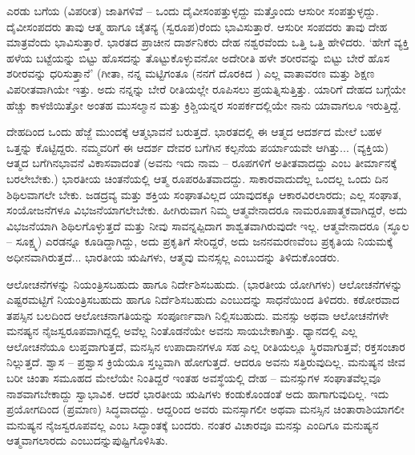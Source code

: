 \vskip 4pt

ಎರಡು ಬಗೆಯ (ವಿಪರೀತ) ಜಾತಿಗಳಿವೆ – ಒಂದು ದೈವೀಸಂಪತ್ತುಳ್ಳದ್ದು ಮತ್ತೊಂದು ಆಸುರೀ ಸಂಪತ್ತುಳ್ಳದ್ದು. ದೈವೀಸಂಪದರು ತಾವು ಆತ್ಮ ಹಾಗೂ ಚೈತನ್ಯ (ಸ್ವರೂಪ)ರೆಂದು ಭಾವಿಸುತ್ತಾರೆ. ಆಸುರೀ ಸಂಪದರು ತಾವು ದೇಹ ಮಾತ್ರವೆಂದು ಭಾವಿಸುತ್ತಾರೆ. ಭಾರತದ ಪ್ರಾಚೀನ ದಾರ್ಶನಿಕರು ದೇಹ ನಶ್ವರವೆಂದು ಒತ್ತಿ ಒತ್ತಿ ಹೇಳಿದರು. `ಹೇಗೆ ವ್ಯಕ್ತಿ ಹಳೆಯ ಬಟ್ಟೆಯನ್ನು ಬಿಟ್ಟು ಹೊಸದನ್ನು ತೊಟ್ಟುಕೊಳ್ಳುವನೋ ಅದೇರೀತಿ ಹಳೇ ಶರೀರವನ್ನು ಬಿಟ್ಟು ಬೇರೆ ಹೊಸ ಶರೀರವನ್ನು ಧರಿಸುತ್ತಾನೆ' (ಗೀತಾ,  ನನ್ನ ಮಟ್ಟಿಗಂತೂ (ನನಗೆ ದೊರಕಿದ ) ಎಲ್ಲ ವಾತಾವರಣ ಮತ್ತು ಶಿಕ್ಷಣ ವಿಪರೀತವಾಗಿಯೇ ಇತ್ತು. ಅದು ನನ್ನನ್ನು ಬೇರೆ ರೀತಿಯಲ್ಲೇ ರೂಪಿಸಲು ಪ್ರಯತ್ನಿಸುತ್ತಿತ್ತು. ಯಾರಿಗೆ ದೇಹದ ಬಗ್ಗೆಯೇ ಹೆಚ್ಚು ಕಾಳಜಿಯಿತ್ತೋ ಅಂತಹ ಮುಸಲ್ಮಾನ ಮತ್ತು ಕ್ರಿಶ್ಚಿಯನ್ನರ ಸಂಪರ್ಕದಲ್ಲಿಯೇ ನಾನು ಯಾವಾಗಲೂ ಇರುತ್ತಿದ್ದೆ.

\vskip 4pt

ದೇಹದಿಂದ ಒಂದು ಹೆಜ್ಜೆ ಮುಂದಕ್ಕೆ ಆತ್ಮಭಾವನೆ ಬರುತ್ತದೆ. ಭಾರತದಲ್ಲಿ ಈ ಆತ್ಮದ ಆದರ್ಶದ ಮೇಲೆ ಬಹಳ ಒತ್ತನ್ನು ಕೊಟ್ಟಿದ್ದರು. ನಮ್ಮವರಿಗೆ ಈ ಆದರ್ಶ ದೇವರ ಬಗೆಗಿನ ಕಲ್ಪನೆಯ ಪರ್ಯಾಯವೇ ಆಗಿತ್ತು... (ವ್ಯಕ್ತಿಯ) ಆತ್ಮದ ಬಗೆಗಿನ\break ಭಾವನೆ ವಿಕಾಸವಾದಂತೆ (ಅವನು ಇದು ನಾಮ – ರೂಪಗಳಿಗೆ ಅತೀತವಾದದ್ದು ಎಂಬ ತೀರ್ಮಾನಕ್ಕೆ ಬರಲೇಬೇಕು.) ಭಾರತೀಯ ಚಿಂತನೆಯಲ್ಲಿ ಆತ್ಮ ರೂಪರಹಿತವಾದದ್ದು. ಸಾಕಾರವಾದುದೆಲ್ಲ ಒಂದಲ್ಲ ಒಂದು ದಿನ ಶಿಥಿಲವಾಗಲೇ ಬೇಕು. ಜಡದ್ರವ್ಯ ಮತ್ತು ಶಕ್ತಿಯ ಸಂಘಾತವಿಲ್ಲದ ಯಾವುದಕ್ಕೂ ಆಕಾರವಿರಲಾರದು; ಎಲ್ಲ ಸಂಘಾತ, ಸಂಯೋಜನೆಗಳೂ ವಿಭಜನೆಯಾಗಲೇಬೇಕು. ಹೀಗಿರುವಾಗ ನಿಮ್ಮ ಆತ್ಮವೇನಾದರೂ ನಾಮರೂಪಾತ್ಮಕವಾಗಿದ್ದರೆ, ಅದು ವಿಭಜನೆಯಾಗಿ ಶಿಥಿಲಗೊಳ್ಳುತ್ತದೆ ಮತ್ತು ನೀವು ಸಾವನ್ನಪ್ಪಿದಾಗ ಶಾಶ್ವತವಾಗಿರುವುದೇ ಇಲ್ಲ. ಆತ್ಮವೇನಾದರೂ (ಸ್ಥೂಲ – ಸೂಕ್ಷ್ಮ) ಎರಡನ್ನೂ ಕೂಡಿದ್ದಾಗಿದ್ದು, ಅದು ಪ್ರಕೃತಿಗೆ ಸೇರಿದ್ದರೆ, ಅದು ಜನನಮರಣವೆಂಬ ಪ್ರಕೃತಿಯ ನಿಯಮಕ್ಕೆ ಅಧೀನವಾಗಿರುತ್ತದೆ... ಭಾರತೀಯ ಋಷಿಗಳು, ಆತ್ಮವು ಮನಸ್ಸಲ್ಲ ಎಂಬುದನ್ನು ತಿಳಿದುಕೊಂಡರು.

\vskip 4pt

ಆಲೋಚನೆಗಳನ್ನು ನಿಯಂತ್ರಿಸಬಹುದು ಹಾಗೂ ನಿರ್ದೇಶಿಸಬಹುದು. (ಭಾರತೀಯ ಯೋಗಿಗಳು) ಆಲೋಚನೆಗಳನ್ನು ಎಷ್ಟರಮಟ್ಟಿಗೆ ನಿಯಂತ್ರಿಸಬಹುದು ಹಾಗೂ ನಿರ್ದೆಶಿಸಬಹುದು ಎಂಬುದನ್ನು ಸಾಧನೆಯಿಂದ ತಿಳಿದರು. ಕಠೋರವಾದ ತಪಸ್ಸಿನ ಬಲದಿಂದ ಆಲೋಚನಾಗತಿಯನ್ನು ಸಂಪೂರ್ಣವಾಗಿ ನಿಲ್ಲಿಸಬಹುದು. ಮನಸ್ಸು ಅಥವಾ ಆಲೋಚನೆಗಳೇ ಮನಷ್ಯನ ನೈಜಸ್ವರೂಪವಾಗಿದ್ದಲ್ಲಿ ಅವೆಲ್ಲ ನಿಂತೊಡನೆಯೇ ಅವನು ಸಾಯಬೇಕಾಗಿತ್ತು. ಧ್ಯಾನದಲ್ಲಿ ಎಲ್ಲ ಆಲೋಚನೆಯೂ ಲುಪ್ತವಾಗುತ್ತದೆ, ಮನಸ್ಸಿನ ಉಪಾದಾನಗಳೂ ಸಹ ಎಲ್ಲ ರೀತಿಯಲ್ಲೂ ಸ್ಥಿರವಾಗುತ್ತವೆ; ರಕ್ತಸಂಚಾರ ನಿಲ್ಲುತ್ತದೆ. ಶ್ವಾಸ – ಪ್ರಶ್ವಾಸ ಕ್ರಿಯೆಯೂ ಸ್ತಬ್ದವಾಗಿ ಹೋಗುತ್ತದೆ. ಆದರೂ ಅವನು ಸತ್ತಿರುವುದಿಲ್ಲ. ಮನುಷ್ಯನ ಜೀವ ಬರೀ ಚಿಂತಾ ಸಮೂಹದ ಮೇಲೆಯೇ ನಿಂತಿದ್ದರೆ ಇಂತಹ ಅವಸ್ಥೆಯಲ್ಲಿ ದೇಹ – ಮನಸ್ಸುಗಳ ಸಂಘಾತವೆಲ್ಲವೂ ನಾಶವಾಗಬೇಕಾದ್ದು ಸ್ವಾಭಾವಿಕ. ಆದರೆ ಭಾರತೀಯ ಋಷಿಗಳು ಕಂಡುಕೊಂಡಂತೆ ಅದು ಹಾಗಾಗುವುದಿಲ್ಲ. ಇದು ಪ್ರಯೋಗದಿಂದ (ಪ್ರಮಾಣ) ಸಿದ್ಧವಾದದ್ದು. ಆದ್ದರಿಂದ ಅವರು ಮನಸ್ಸಾಗಲೀ ಅಥವಾ ಮನಸ್ಸಿನ ಚಿಂತಾರಾಶಿಯಾಗಲೀ ಮನುಷ್ಯನ ನೈಜಸ್ವರೂಪವಲ್ಲ ಎಂಬ ಸಿದ್ಧಾಂತಕ್ಕೆ ಬಂದರು. ನಂತರ ವಿಚಾರವೂ ಮನಸ್ಸು ಎಂದಿಗೂ ಮನುಷ್ಯನ ಆತ್ಮವಾಗಲಾರದು ಎಂಬುದನ್ನು\break ಪುಷ್ಟಿಗೊಳಿಸಿತು.

\vskip 4pt


